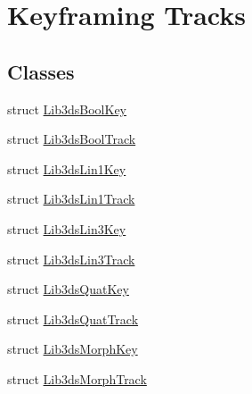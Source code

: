 \hypertarget{group__tracks}{\section{Keyframing Tracks}
\label{group__tracks}
}
\subsection*{Classes}
\begin{DoxyCompactItemize}
\item 
struct \hyperlink{struct_lib3ds_bool_key}{Lib3ds\-Bool\-Key}
\item 
struct \hyperlink{struct_lib3ds_bool_track}{Lib3ds\-Bool\-Track}
\item 
struct \hyperlink{struct_lib3ds_lin1_key}{Lib3ds\-Lin1\-Key}
\item 
struct \hyperlink{struct_lib3ds_lin1_track}{Lib3ds\-Lin1\-Track}
\item 
struct \hyperlink{struct_lib3ds_lin3_key}{Lib3ds\-Lin3\-Key}
\item 
struct \hyperlink{struct_lib3ds_lin3_track}{Lib3ds\-Lin3\-Track}
\item 
struct \hyperlink{struct_lib3ds_quat_key}{Lib3ds\-Quat\-Key}
\item 
struct \hyperlink{struct_lib3ds_quat_track}{Lib3ds\-Quat\-Track}
\item 
struct \hyperlink{struct_lib3ds_morph_key}{Lib3ds\-Morph\-Key}
\item 
struct \hyperlink{struct_lib3ds_morph_track}{Lib3ds\-Morph\-Track}
\end{DoxyCompactItemize}
